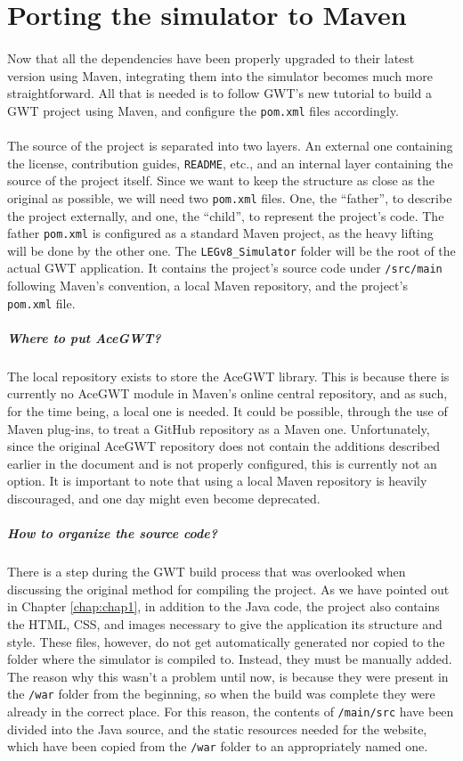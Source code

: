 \section{Porting the simulator to Maven}
\paragraph{}
Now that all the dependencies have been properly upgraded to their latest version using Maven, integrating them into the simulator becomes much more straightforward. All that is needed is to follow GWT's new tutorial to build a GWT project using Maven, and configure the \verb|pom.xml| files accordingly.
\paragraph{}
The source of the project is separated into two layers. An external one containing the license, contribution guides, \verb|README|, etc., and an internal layer containing the source of the project itself. Since we want to keep the structure as close as the original as possible, we will need two \verb|pom.xml| files. One, the ``father'',  to describe the project externally, and one, the ``child'', to represent the project's code. The father \verb|pom.xml| is configured as a standard Maven project, as the heavy lifting will be done by the other one. The \verb|LEGv8_Simulator| folder will be the root of the actual GWT application. It contains the project's source code under \verb|/src/main| following Maven's convention, a local Maven repository, and the project's \verb|pom.xml| file. 
\subparagraph{Where to put AceGWT?}
The local repository exists to store the AceGWT library. This is because there is currently no AceGWT module in Maven's online central repository, and as such, for the time being,  a local one is needed.  It could be possible, through the use of Maven plug-ins, to treat a GitHub repository as a Maven one. Unfortunately, since the original AceGWT repository does not contain the additions described earlier in the document and is not properly configured, this is currently not an option. It is important to note that using a local Maven repository is heavily discouraged, and one day might even become deprecated.
\subparagraph{How to organize the source code?}
There is a step during the GWT build process that was overlooked when discussing the original method for compiling the project. As we have pointed out in Chapter \ref{chap:chap1}, in addition to the Java code, the project also contains the HTML, CSS, and images necessary to give the application its structure and style. These files, however, do not get automatically generated nor copied to the folder where the simulator is compiled to. Instead, they must be manually added. The reason why this wasn't a problem until now, is because they were present in the \verb|/war| folder from the beginning, so when the build was complete they were already in the correct place. For this reason, the contents of \verb|/main/src| have been divided into the Java source, and the static resources needed for the website, which have been copied from the \verb|/war| folder to an appropriately named one.
